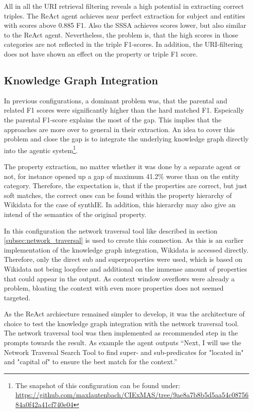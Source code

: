 \documentclass[a4paper,oneside,bibliography=totoc]{scrbook}
\begin{document}
All in all the URI retrieval filtering reveals a high potential in extracting correct triples. The ReAct agent achieves near perfect extraction for subject and entities with scores above 0.885 F1. Also the \ac{SSSA} achieves scores lower, but also similar to the ReAct agent. Nevertheless, the problem is, that the high scores in those categories are not reflected in the triple F1-scores. In addition, the URI-filtering does not have shown an effect on the property or triple F1 score.

\subsection{Knowledge Graph Integration}
\label{subsec:knowledge_graph_integration}

In previous configurations, a dominant problem was, that the parental and related F1 scores were significantly higher than the hard matched F1. Espeically the parental F1-score explains the most of the gap. This implies that the approaches are more over to general in their extraction. An idea to cover this problem and close the gap is to integrate the underlying knowledge graph directly into the agentic system\footnote{The snapshot of this configuration can be found under: \url{https://github.com/maxlautenbach/CIExMAS/tree/9ae8a7b8b5d5aa54c0875684a0f42a41cf740e04}}.

The property extraction, no matter whether it was done by a separate agent or not, for instance opened up a gap of maximum 41.2\% worse than on the entity category. Therefore, the expectation is, that if the properties are correct, but just soft matches, the correct ones can be found within the property hierarchy of Wikidata for the case of synthIE. In addition, this hierarchy may also give an intend of the semantics of the original property.

In this configuration the network traversal tool like described in section \ref{subsec:network_traversal} is used to create this connection. As this is an earlier implementation of the knowledge graph integration, Wikidata is accessed directly. Therefore, only the direct sub and superproperties were used, which is based on Wikidata not being loopfree and additional on the immense amount of properties that could appear in the output. As context window overflows were already a problem, bloating the context with even more properties does not seemed targeted.

As the ReAct archiecture remained simpler to develop, it was the architecture of choice to test the knowledge graph integration with the network traversal tool. The network traversal tool was then implemented as recommended step in the prompts towards the result. As example the agent outputs \enquote{Next, I will use the Network Traversal Search Tool to find super- and sub-predicates for "located in" and "capital of" to ensure the best match for the context.}
\end{document}
